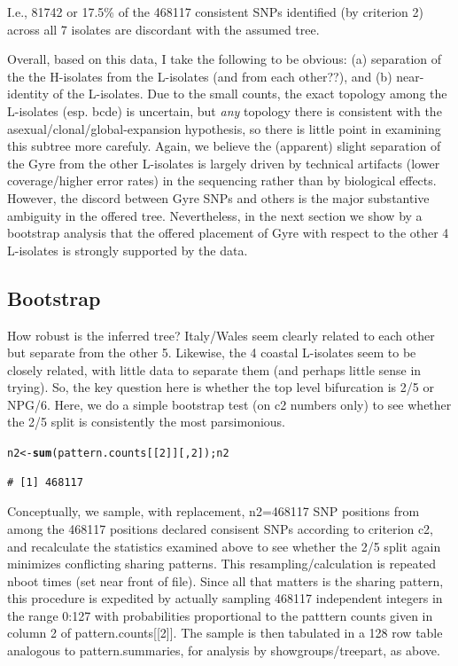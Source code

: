 \documentclass{article}\usepackage[]{graphicx}\usepackage[]{color}
\makeatletter
\newcommand{\hlnum}[1]{\textcolor[rgb]{0.686,0.059,0.569}{#1}}%
\newcommand{\hlstd}[1]{\textcolor[rgb]{0.345,0.345,0.345}{#1}}%
\newcommand{\hlkwb}[1]{\textcolor[rgb]{0.69,0.353,0.396}{#1}}%
\newcommand{\hlkwd}[1]{\textcolor[rgb]{0.737,0.353,0.396}{\textbf{#1}}}%
\newenvironment{kframe}{%
 \def\at@end@of@kframe{}%
 \ifinner\ifhmode%
  \def\at@end@of@kframe{\end{minipage}}%
  \begin{minipage}{\columnwidth}%
 \fi\fi%
 \def\FrameCommand##1{\hskip\@totalleftmargin \hskip-\fboxsep
 \colorbox{shadecolor}{##1}\hskip-\fboxsep
     \hskip-\linewidth \hskip-\@totalleftmargin \hskip\columnwidth}%
 \MakeFramed {\advance\hsize-\width
   \@totalleftmargin\z@ \linewidth\hsize
   \@setminipage}}%
 {\par\unskip\endMakeFramed%
 \at@end@of@kframe}
\newenvironment{knitrout}{}{} %
\makeatother
\begin{document}
I.e., 81742 or 17.5\% of the 468117 consistent SNPs identified (by criterion 2) across all 7 isolates are discordant with the assumed tree.

Overall, based on this data, I take the following to be obvious: (a) separation of the the H-isolates from the L-isolates (and from each other??), and (b) near-identity of the L-isolates.  Due to the small counts, the exact topology among the L-isolates (esp. bcde) is uncertain, but \emph{any} topology there is consistent with the asexual/clonal/global-expansion hypothesis, so there is little point in examining this subtree more carefuly. Again, we believe the (apparent) slight separation of the Gyre from the other L-isolates is largely driven by technical artifacts (lower coverage/higher error rates) in the sequencing rather than by biological effects.  However, the discord between Gyre SNPs and others is the major substantive ambiguity in the offered tree.  Nevertheless, in the next section we show by a bootstrap analysis that the offered placement of Gyre with respect to the other 4 L-isolates is strongly supported by the data.

\subsection{Bootstrap}
How robust is the inferred tree?  Italy/Wales seem clearly related to each other but separate from the other 5.
Likewise, the 4 coastal L-isolates seem to be closely related, with little data to separate them (and perhaps little sense in
trying).  So, the key question here is whether the top level bifurcation is 2/5 or NPG/6.  Here, we do a simple
bootstrap test (on c2 numbers only) to see whether the 2/5 split is consistently the most parsimonious.

\begin{knitrout}\footnotesize
{}\color{fgcolor}\begin{kframe}
\begin{alltt}
\hlstd{n2} \hlkwb{<-} \hlkwd{sum}\hlstd{(pattern.counts[[}\hlnum{2}\hlstd{]][,}\hlnum{2}\hlstd{]); n2}
\end{alltt}
\begin{verbatim}
# [1] 468117
\end{verbatim}
\end{kframe}
\end{knitrout}

Conceptually, we sample, with replacement, n2=468117 SNP positions from among the
468117 positions declared consisent SNPs according to criterion c2, and recalculate the
statistics examined above to see whether the 2/5 split again minimizes conflicting sharing patterns.  This
resampling/calculation is repeated nboot times (set near front of file). Since all that matters is the sharing pattern, this
procedure is expedited by actually sampling 468117 independent integers in the range 0:127 with
probabilities proportional to the patttern counts given in column 2 of pattern.counts[[2]].  The sample is then
tabulated in a 128 row table analogous to pattern.summaries, for analysis by showgroups/treepart, as above.
\end{document}

